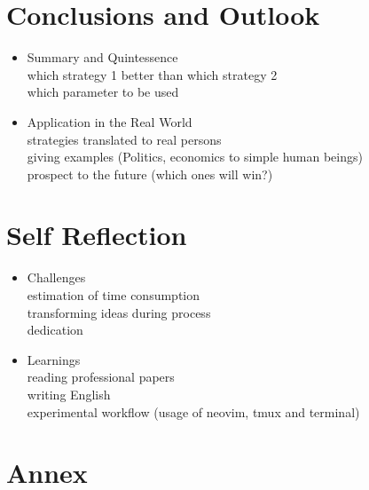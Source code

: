 \documentclass{article}
\begin{document}
\section{Conclusions and Outlook}
\begin{itemize}

	\item Summary and Quintessence\\
		which strategy 1 better than which strategy 2\\
		which parameter to be used\\

	\item Application in the Real World\\
		strategies translated to real persons\\
		giving examples (Politics, economics to simple human beings)\\
		prospect to the future (which ones will win?)

\end{itemize}

\section{Self Reflection}
\begin{itemize}

	\item Challenges\\
		estimation of time consumption\\
		transforming ideas during process\\
		dedication

	\item Learnings\\
		reading professional papers\\
		writing English\\
		experimental workflow (usage of neovim, tmux and terminal)

\end{itemize}

\section{Annex}
\end{document}
